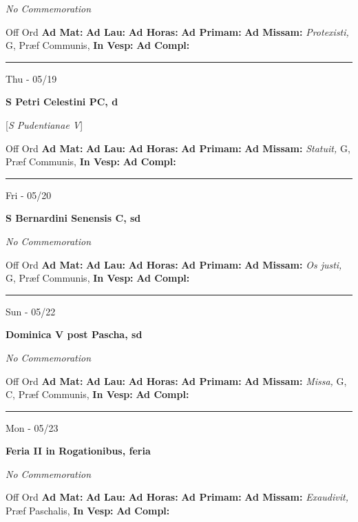 \documentclass[letterpaper, 10pt]{article}
\begin{document}
\textit{No Commemoration}\begin{justify}
Off Ord
\textbf{Ad Mat: }
\textbf{Ad Lau: }
\textbf{Ad Horas: }
\textbf{Ad Primam: }
\textbf{Ad Missam:} \textit{Protexisti, } G, Præf Communis, 
\textbf{In Vesp: }
\textbf{Ad Compl: }\end{justify}



\hrule
\begin{center}
Thu - 05/19
\end{center}\textbf{ \large S Petri Celestini PC, \textnormal{\normalsize d}}

[\textit{S Pudentianae V}]
\begin{justify}
Off Ord
\textbf{Ad Mat: }
\textbf{Ad Lau: }
\textbf{Ad Horas: }
\textbf{Ad Primam: }
\textbf{Ad Missam:} \textit{Statuit, } G, Præf Communis, 
\textbf{In Vesp: }
\textbf{Ad Compl: }\end{justify}



\hrule
\begin{center}
Fri - 05/20
\end{center}\textbf{ \large S Bernardini Senensis C, \textnormal{\normalsize sd}}

\textit{No Commemoration}\begin{justify}
Off Ord
\textbf{Ad Mat: }
\textbf{Ad Lau: }
\textbf{Ad Horas: }
\textbf{Ad Primam: }
\textbf{Ad Missam:} \textit{Os justi, } G, Præf Communis, 
\textbf{In Vesp: }
\textbf{Ad Compl: }\end{justify}



\hrule
\begin{center}
Sun - 05/22
\end{center}\textbf{ \large Dominica V post Pascha, \textnormal{\normalsize sd}}

\textit{No Commemoration}\begin{justify}
Off Ord
\textbf{Ad Mat: }
\textbf{Ad Lau: }
\textbf{Ad Horas: }
\textbf{Ad Primam: }
\textbf{Ad Missam:} \textit{Missa, } G, C, Præf Communis, 
\textbf{In Vesp: }
\textbf{Ad Compl: }\end{justify}



\hrule
\begin{center}
Mon - 05/23
\end{center}\textbf{ \large Feria II in Rogationibus, \textnormal{\normalsize feria}}

\textit{No Commemoration}\begin{justify}
Off Ord
\textbf{Ad Mat: }
\textbf{Ad Lau: }
\textbf{Ad Horas: }
\textbf{Ad Primam: }
\textbf{Ad Missam:} \textit{Exaudivit, } Præf Paschalis, 
\textbf{In Vesp: }
\textbf{Ad Compl: }\end{justify}
\end{document}
